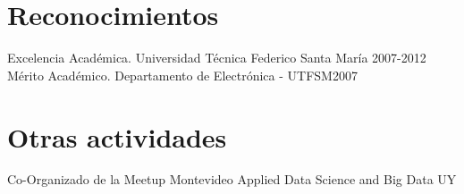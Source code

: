\documentclass{article}
\begin{document}
	\section{Reconocimientos}
	
	\ralewaysb Excelencia Académica. \raleway Universidad Técnica Federico Santa María \hfill 2007-2012
	\ralewaysb Mérito Académico. \raleway Departamento de Electrónica - UTFSM\hfill 2007
	
	\section{Otras actividades}
	Co-Organizado de la Meetup Montevideo Applied Data Science and Big Data UY
\end{document}
